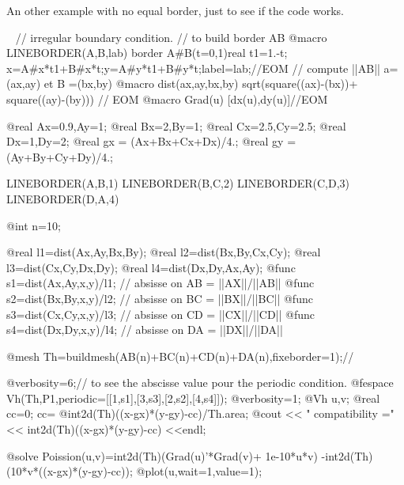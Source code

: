 \documentclass[a4paper,twoside,12pt]{book}
\begin{document}
An other example with no equal border, just to see if the code works.
\begin{example}~
\label{exm:periodic4bis}
\bFF
// irregular boundary condition.
//  to build border  AB
@macro  LINEBORDER(A,B,lab) border A#B(t=0,1){real t1=1.-t;
   x=A#x*t1+B#x*t;y=A#y*t1+B#y*t;label=lab;}//EOM
// compute  ||AB||  a=(ax,ay) et B =(bx,by)
@macro dist(ax,ay,bx,by) sqrt(square((ax)-(bx))+ square((ay)-(by)))  // EOM
@macro Grad(u) [dx(u),dy(u)]//EOM


@real Ax=0.9,Ay=1;              @real Bx=2,By=1;
@real Cx=2.5,Cy=2.5;            @real Dx=1,Dy=2;
@real gx = (Ax+Bx+Cx+Dx)/4.;    @real gy = (Ay+By+Cy+Dy)/4.;


LINEBORDER(A,B,1)
LINEBORDER(B,C,2)
LINEBORDER(C,D,3)
LINEBORDER(D,A,4)

@int n=10;

@real l1=dist(Ax,Ay,Bx,By);
@real l2=dist(Bx,By,Cx,Cy);
@real l3=dist(Cx,Cy,Dx,Dy);
@real l4=dist(Dx,Dy,Ax,Ay);
@func s1=dist(Ax,Ay,x,y)/l1;  // absisse on  AB  = ||AX||/||AB||
@func s2=dist(Bx,By,x,y)/l2;  // absisse on  BC  = ||BX||/||BC||
@func s3=dist(Cx,Cy,x,y)/l3;  // absisse on  CD  = ||CX||/||CD||
@func s4=dist(Dx,Dy,x,y)/l4;  // absisse on  DA  = ||DX||/||DA||

@mesh Th=buildmesh(AB(n)+BC(n)+CD(n)+DA(n),fixeborder=1);//

@verbosity=6;// to see the abscisse value pour the periodic condition.
@fespace Vh(Th,P1,periodic=[[1,s1],[3,s3],[2,s2],[4,s4]]);
@verbosity=1;
@Vh u,v;
@real cc=0;
cc= @int2d(Th)((x-gx)*(y-gy)-cc)/Th.area;
@cout << " compatibility =" << int2d(Th)((x-gx)*(y-gy)-cc) <<endl;

@solve Poission(u,v)=int2d(Th)(Grad(u)'*Grad(v)+ 1e-10*u*v)
  -int2d(Th)(10*v*((x-gx)*(y-gy)-cc));
@plot(u,wait=1,value=1);
\eFF
\end{example}
\end{document}
